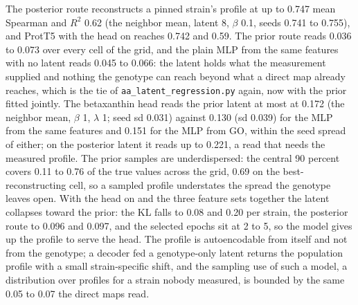 The posterior route reconstructs a pinned strain's profile at up to 0.747 mean Spearman
and $R^2$ 0.62 (the neighbor mean, latent 8, $\beta$ 0.1, seeds 0.741 to 0.755), and
ProtT5 with the head on reaches 0.742 and 0.59. The prior route reads 0.036 to 0.073
over every cell of the grid, and the plain MLP from the same features with no latent
reads 0.045 to 0.066: the latent holds what the measurement supplied and nothing the
genotype can reach beyond what a direct map already reaches, which is the tie of
\texttt{aa\_latent\_regression.py} again, now with the prior fitted jointly. The
betaxanthin head reads the prior latent at most at 0.172 (the neighbor mean, $\beta$ 1,
$\lambda$ 1; seed sd 0.031) against 0.130 (sd 0.039) for the MLP from the same features
and 0.151 for the MLP from GO, within the seed spread of either; on the posterior latent
it reads up to 0.221, a read that needs the measured profile. The prior samples are
underdispersed: the central 90 percent covers 0.11 to 0.76 of the true values across
the grid, 0.69 on the best-reconstructing cell, so a sampled profile understates the
spread the genotype leaves open. With the head on and the three feature sets together
the latent collapses toward the prior: the KL falls to 0.08 and 0.20 per strain, the
posterior route to 0.096 and 0.097, and the selected epochs sit at 2 to 5, so the
model gives up the profile to serve the head. The profile is autoencodable from itself
and not from the genotype; a decoder fed a genotype-only latent returns the population
profile with a small strain-specific shift, and the sampling use of such a model, a
distribution over profiles for a strain nobody measured, is bounded by the same 0.05
to 0.07 the direct maps read.




